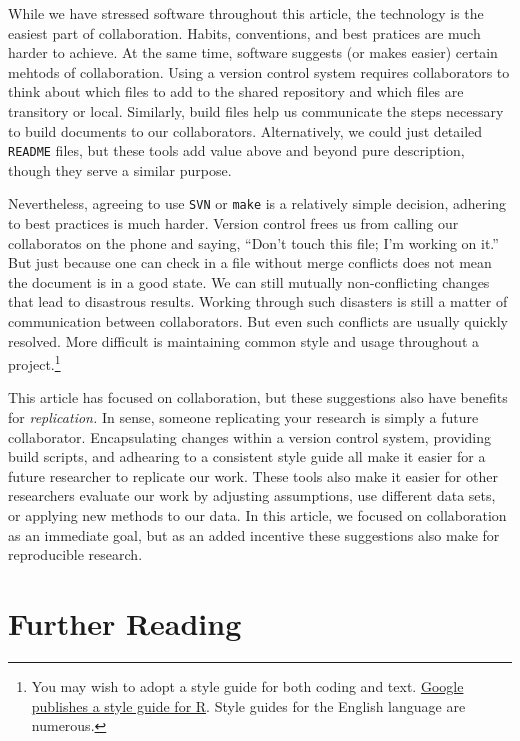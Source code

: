 \documentclass[]{article}
\begin{document}
While we have stressed software throughout this article, the technology is the
easiest part of collaboration. Habits, conventions, and best pratices are much
harder to achieve. At the same time, software suggests (or makes easier)
certain mehtods of collaboration. Using a version control system requires
collaborators to think about which files to add to the shared repository and
which files are transitory or local. Similarly, build files help us
communicate the steps necessary to build documents to our collaborators.
Alternatively, we could just detailed \texttt{README} files, but these tools
add value above and beyond pure description, though they serve a similar
purpose.

Nevertheless, agreeing to use \texttt{SVN} or \texttt{make} is a relatively
simple decision, adhering to best practices is much harder. Version control
frees us from calling our collaboratos on the phone and saying, ``Don't touch
this file; I'm working on it.'' But just because one can check in a file
without merge conflicts does not mean the document is in a good state. We can
still mutually non-conflicting changes that lead to disastrous results.
Working through such disasters is still a matter of communication between
collaborators. But even such conflicts are usually quickly resolved. More
difficult is maintaining common style and usage throughout a
project.\footnote{You may wish to adopt a style guide for both coding and
text.
\href{http://google-styleguide.googlecode.com/svn/trunk/google-r-style.html}
{Google publishes a style guide for
R}.
Style guides for the English language are numerous.}

This article has focused on collaboration, but these suggestions also have
benefits for \emph{replication.} In sense, someone replicating your research
is simply a future collaborator. Encapsulating changes within a version
control system, providing build scripts, and adhearing to a consistent style
guide all make it easier for a future researcher to replicate our work. These
tools also make it easier for other researchers evaluate our work by adjusting 
assumptions, use
different data sets, or applying new methods to our data. In this article, we
focused on collaboration as an immediate goal, but as an added incentive these
suggestions also make for reproducible research. 


\section{Further Reading}

\end{document}
